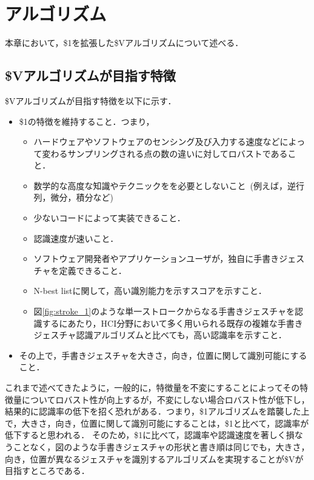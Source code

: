 \chapter{\SysName アルゴリズム}
本章において，\$1を拡張した\$Vアルゴリズムについて述べる．

\section{\$Vアルゴリズムが目指す特徴}
\$Vアルゴリズムが目指す特徴を以下に示す．
\begin{itemize}
\item \$1の特徴を維持すること．つまり，
\begin{itemize}
\item ハードウェアやソフトウェアのセンシング及び入力する速度などによって変わるサンプリングされる点の数の違いに対してロバストであること．
\item 数学的な高度な知識やテクニックをを必要としないこと~(例えば，逆行列，微分，積分など)
\item 少ないコードによって実装できること．
\item 認識速度が速いこと．
\item ソフトウェア開発者やアプリケーションユーザが，独自に手書きジェスチャを定義できること．
\item N-best listに関して，高い識別能力を示すスコアを示すこと．
\item 図\ref{fig:stroke_1}のような単一ストロークからなる手書きジェスチャを認識するにあたり，HCI分野において多く用いられる既存の複雑な手書きジェスチャ認識アルゴリズムと比べても，高い認識率を示すこと．
\end{itemize}
\item その上で，手書きジェスチャを大きさ，向き，位置に関して識別可能にすること．
\end{itemize}

これまで述べてきたように，一般的に，特徴量を不変にすることによってその特徴量についてロバスト性が向上するが，不変にしない場合ロバスト性が低下し，結果的に認識率の低下を招く恐れがある．つまり，\$1アルゴリズムを踏襲した上で，大きさ，向き，位置に関して識別可能にすることは，\$1と比べて，認識率が低下すると思われる．
そのため，\$1に比べて，認識率や認識速度を著しく損なうことなく，図のような手書きジェスチャの形状と書き順は同じでも，大きさ，向き，位置が異なるジェスチャを識別するアルゴリズムを実現することが\$Vが目指すところである．


